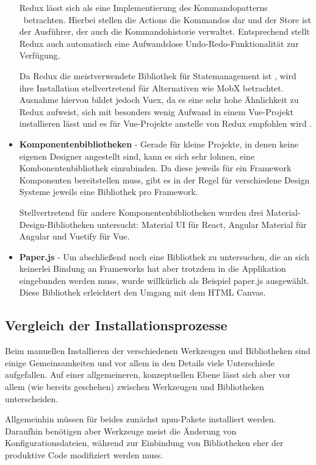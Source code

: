 \begin{itemize}
Redux lässt sich als eine Implementierung des Kommandopatterns \missingQuote\ betrachten. Hierbei stellen die Actions die Kommandos dar und der Store ist der Ausführer, der auch die Kommandohistorie verwaltet. Entsprechend stellt Redux auch automatisch eine Aufwandslose Undo-Redo-Funktionalität zur Verfügung.

Da Redux die meistverwendete Bibliothek für Statemanagement ist \cite{stateofjs}, wird ihre Installation stellvertretend für Alternativen wie MobX betrachtet. Ausnahme hiervon bildet jedoch Vuex, da es eine sehr hohe Ähnlichkeit zu Redux aufweist, sich mit besonders wenig Aufwand in einem Vue-Projekt installieren lässt und es für Vue-Projekte anstelle von Redux empfohlen wird \cite{vuejs_docs:redux_vs_vuex}.

\item \textbf{Komponentenbibliotheken} - Gerade für kleine Projekte, in denen keine eigenen Designer angestellt sind, kann es sich sehr lohnen, eine Kombonentenbibliothek einzubinden. Da diese jeweils für ein Framework Komponenten bereitstellen muss, gibt es in der Regel für verschiedene Design Systeme jeweils eine Bibliothek pro Framework.

Stellvertretend für andere Komponentenbibliotheken wurden drei Material-Design-Bibliotheken untersucht: Material UI für React, Angular Material für Angular und Vuetify für Vue.

\item \textbf{Paper.js} - Um abschließend noch eine Bibliothek zu untersuchen, die an sich keinerlei Bindung an Frameworks hat aber trotzdem in die Applikation eingebunden werden muss, wurde willkürlich als Beispiel paper.js ausgewählt. Diese Bibliothek erleichtert den Umgang mit dem HTML Canvas.
\end{itemize}

\subsection{Vergleich der Installationsprozesse}
Beim manuellen Installieren der verschiedenen Werkzeugen und Bibliotheken sind einige Gemeinsamkeiten und vor allem in den Details viele Unterschiede aufgefallen. Auf einer allgemeineren, konzeptuellen Ebene lässt sich aber vor allem (wie bereits geschehen) zwischen Werkzeugen und Bibliotheken unterscheiden.

Allgemeinhin müssen für beides zunächst \gls{npm}-Pakete installiert werden. Daraufhin benötigen aber Werkzeuge meist die Änderung von Konfigurationsdateien, während zur Einbindung von Bibliotheken eher der produktive Code modifiziert werden muss.

